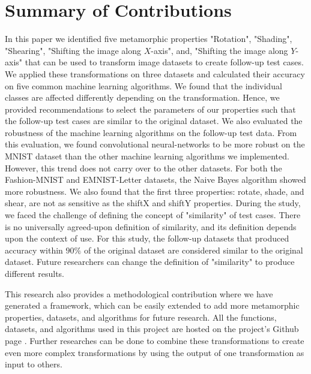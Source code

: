 \section{Summary of Contributions}
In this paper we identified five metamorphic properties "Rotation", "Shading", "Shearing", "Shifting the image along $X$-axis", and, "Shifting the image along $Y$-axis" that can be used to transform image datasets to create follow-up test cases.  We applied these transformations on three datasets and calculated their accuracy on five common machine learning algorithms. We found that the individual classes are affected differently depending on the transformation. Hence, we provided recommendations to select the parameters of our properties such that the follow-up test cases are similar to the original dataset. 
We also evaluated the robustness of the machine learning algorithms on the follow-up test data. From this evaluation, we found convolutional neural-networks to be more robust on the MNIST dataset than the other machine learning algorithms we implemented. However, this trend does not carry over to the other datasets. For both the Fashion-MNIST and EMNIST-Letter datasets, the Naive Bayes algorithm showed more robustness. We also found that the first three properties: rotate, shade, and shear, are not as sensitive as the shiftX and shiftY properties.
During the study, we faced the challenge of defining the concept of "similarity" of test cases. There is no universally agreed-upon definition of similarity, and its definition depends upon the context of use. For this study, the follow-up datasets that produced accuracy within $90\%$ of the original dataset are considered similar to the original dataset. Future researchers can change the definition of "similarity" to produce different results.


This research also provides a methodological contribution where we have generated a framework, which can be easily extended to add more metamorphic properties, datasets, and algorithms for future research. All the functions, datasets, and algorithms used in this project are hosted on the project's Github page \cite{abhishek2020}. Further researches can be done to combine these transformations to create even more complex transformations by using the output of one transformation as input to others.

